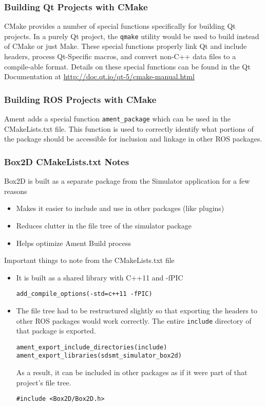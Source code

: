 \subsubsection*{Building Qt Projects with CMake}
CMake provides a number of special functions specifically for building Qt projects. In a purely Qt project, the \lstinline|qmake| utility would be used to build instead of CMake or just Make. These special functions properly link Qt and include headers, process Qt-Specific macros, and convert non-C++ data files to a compile-able format. Details on these special functions can be found in the Qt Documentation at \url{http://doc.qt.io/qt-5/cmake-manual.html}

\subsubsection*{Building ROS Projects with CMake}
Ament adds a special function \lstinline|ament_package| which can be used in the CMakeLists.txt file. This function is used to correctly identify what portions of the package should be accessible for inclusion and linkage in other ROS packages.

\subsubsection*{Box2D CMakeLists.txt Notes}
Box2D is built as a separate package from the Simulator application for a few reasons
\begin{itemize}
	\item Makes it easier to include and use in other packages (like plugins)
	\item Reduces clutter in the file tree of the simulator package
	\item Helps optimize Ament Build process
\end{itemize}

Important things to note from the CMakeLists.txt file
\begin{itemize}
	\item It is built as a shared library with C++11 and -fPIC
	\begin{lstlisting}
add_compile_options(-std=c++11 -fPIC)
	\end{lstlisting}
	\item The file tree had to be restructured slightly so that exporting the headers to other ROS packages would work correctly. The entire \lstinline|include| directory of that package is exported.

	\begin{lstlisting}
ament_export_include_directories(include)
ament_export_libraries(sdsmt_simulator_box2d)
	\end{lstlisting}
	As a result, it can be included in other packages as if it were part of that project's file tree.
	\begin{lstlisting}
#include <Box2D/Box2D.h>
	\end{lstlisting}
\end{itemize}
